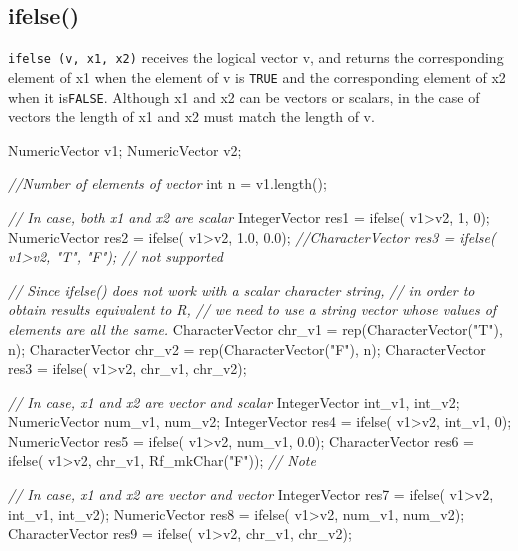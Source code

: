 \documentclass[]{book}
\newenvironment{Shaded}{\begin{snugshade}}{\end{snugshade}}
\newcommand{\DataTypeTok}[1]{\textcolor[rgb]{0.13,0.29,0.53}{#1}}
\newcommand{\DecValTok}[1]{\textcolor[rgb]{0.00,0.00,0.81}{#1}}
\newcommand{\FloatTok}[1]{\textcolor[rgb]{0.00,0.00,0.81}{#1}}
\newcommand{\StringTok}[1]{\textcolor[rgb]{0.31,0.60,0.02}{#1}}
\newcommand{\CommentTok}[1]{\textcolor[rgb]{0.56,0.35,0.01}{\textit{#1}}}
\newcommand{\NormalTok}[1]{#1}
\theoremstyle{definition}
\theoremstyle{definition}
\theoremstyle{remark}
\begin{document}
\subsection{ifelse()}\label{ifelse}

\texttt{ifelse\ (v,\ x1,\ x2)} receives the logical vector v, and
returns the corresponding element of x1 when the element of v is
\texttt{TRUE} and the corresponding element of x2 when it
is\texttt{FALSE}. Although x1 and x2 can be vectors or scalars, in the
case of vectors the length of x1 and x2 must match the length of v.

\begin{Shaded}
\begin{Highlighting}[]
\NormalTok{NumericVector v1;}
\NormalTok{NumericVector v2;}

\CommentTok{//Number of elements of vector}
\DataTypeTok{int}\NormalTok{ n = v1.length();}

\CommentTok{// In case, both x1 and x2 are scalar}
\NormalTok{IntegerVector res1     = ifelse( v1>v2, }\DecValTok{1}\NormalTok{, }\DecValTok{0}\NormalTok{);}
\NormalTok{NumericVector res2     = ifelse( v1>v2, }\FloatTok{1.0}\NormalTok{, }\FloatTok{0.0}\NormalTok{);}
\CommentTok{//CharacterVector res3 = ifelse( v1>v2, "T", "F"); // not supported}


\CommentTok{// Since ifelse() does not work with a scalar character string,}
\CommentTok{// in order to obtain results equivalent to R,}
\CommentTok{// we need to use a string vector whose values of elements are all the same.}
\NormalTok{CharacterVector chr_v1 = rep(CharacterVector(}\StringTok{"T"}\NormalTok{), n);}
\NormalTok{CharacterVector chr_v2 = rep(CharacterVector(}\StringTok{"F"}\NormalTok{), n);}
\NormalTok{CharacterVector res3   = ifelse( v1>v2, chr_v1, chr_v2);}

\CommentTok{// In case, x1 and x2 are vector and scalar}
\NormalTok{IntegerVector int_v1, int_v2;}
\NormalTok{NumericVector num_v1, num_v2;}
\NormalTok{IntegerVector   res4 = ifelse( v1>v2, int_v1, }\DecValTok{0}\NormalTok{);}
\NormalTok{NumericVector   res5 = ifelse( v1>v2, num_v1, }\FloatTok{0.0}\NormalTok{);}
\NormalTok{CharacterVector res6 = ifelse( v1>v2, chr_v1, Rf_mkChar(}\StringTok{"F"}\NormalTok{)); }\CommentTok{// Note}

\CommentTok{// In case, x1 and x2 are vector and vector}
\NormalTok{IntegerVector   res7 = ifelse( v1>v2, int_v1, int_v2);}
\NormalTok{NumericVector   res8 = ifelse( v1>v2, num_v1, num_v2);}
\NormalTok{CharacterVector res9 = ifelse( v1>v2, chr_v1, chr_v2);}
\end{Highlighting}
\end{Shaded}
\end{document}
